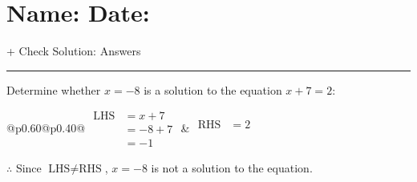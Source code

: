 \documentclass[12pt]{article}
\def \HeadingAnswers {\section*{\Large Name: \underline{\hspace{8cm}} \hfill Date: \underline{\hspace{3cm}}} \vspace{-3mm}
{+ Check Solution: Answers} \vspace{1pt}\hrule}
\newcounter{minipagecount}
\begin{document}
\HeadingAnswers
\vspace{1pt}
\begin{multicols}{2}
\noindent{(\theminipagecount)}\hspace{0.1mm} %
\begin{minipage}[t]{0.40\textwidth} %

    \noindent Determine whether \(x = -8\) is a solution to the equation \(x + 7 = 2\):
    \vspace{4pt}  %

    \noindent
    \renewcommand{\arraystretch}{1.3} %
    \begin{tabular}{@{}p{0.60\linewidth}@{}p{0.40\linewidth}@{}}
        \(\begin{aligned}
            \text{LHS} &= x + 7 \\
                    &= -8 + 7 \\
                    &= -1 
        \end{aligned}\) &
        \(\begin{aligned}
            \text{RHS} &= 2\\
                    & \\
                    &
        \end{aligned}\)
    \end{tabular}
    \renewcommand{\arraystretch}{1.0} %
    \vspace{2pt}  %

    \noindent \(\therefore\) Since \(\text{LHS} \neq \text{RHS}\), \(x = -8\) is not  a solution to the equation.

\end{minipage}

 \vspace*{16pt}
\noindent{(\theminipagecount)}\hspace{0.1mm} %
\begin{minipage}[t]{0.40\textwidth} %


\end{minipage}
\end{multicols}
\end{document}
